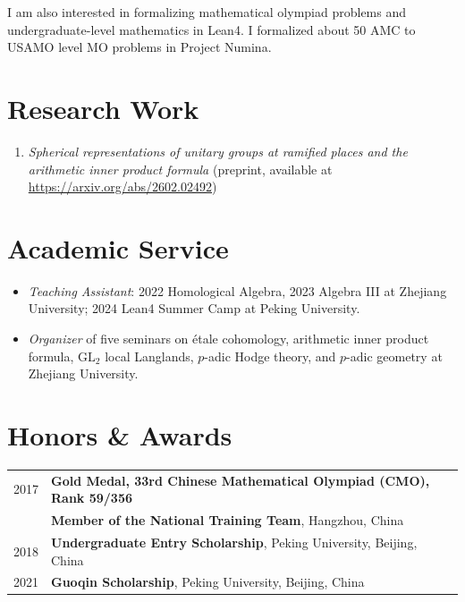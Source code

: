 \documentclass[11pt,a4paper]{ctexart}
\begin{document}
I am also interested in formalizing mathematical olympiad problems and undergraduate-level mathematics in Lean4. I formalized about 50 AMC to USAMO level MO problems in Project Numina.

\section{Research Work}
\begin{enumerate}[label=(\arabic*), leftmargin=1.8em, itemsep=0.2em, topsep=0.15em]
    \item \textit{Spherical representations of unitary groups at ramified places and the arithmetic inner product formula} (preprint, available at \url{https://arxiv.org/abs/2602.02492})
\end{enumerate}

\section{Academic Service}
\begin{itemize}[leftmargin=1.4em, itemsep=0.2em, topsep=0.15em]
    \item \textit{Teaching Assistant}: 2022 Homological Algebra, 2023 Algebra III at Zhejiang University; 2024 Lean4 Summer Camp at Peking University.
    \item \textit{Organizer} of five seminars on \'etale cohomology, arithmetic inner product formula, \(\mathrm{GL}_2\) local Langlands, \(p\)-adic Hodge theory, and \(p\)-adic geometry at Zhejiang University.
\end{itemize}

\section{Honors \& Awards}
\begin{tabularx}{\textwidth}{L{1.1in}Y}
2017 &
\textbf{Gold Medal, 33rd Chinese Mathematical Olympiad (CMO), Rank 59/356} \\
& \textbf{Member of the National Training Team}, Hangzhou, China \\[0.15em]

2018 &
\textbf{Undergraduate Entry Scholarship}, Peking University, Beijing, China \\[0.15em]

2021 &
\textbf{Guoqin Scholarship}, Peking University, Beijing, China \\
\end{tabularx}
\end{document}
